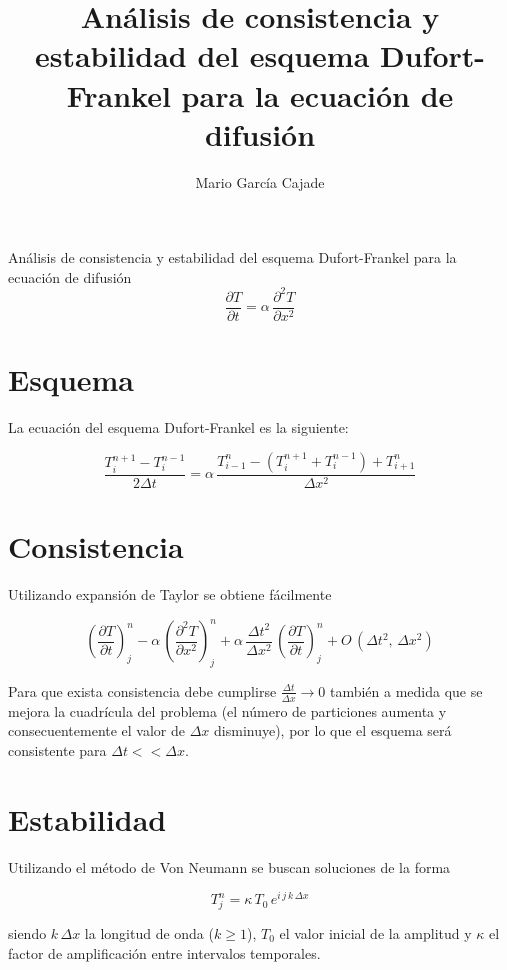 \documentclass[a4paper,3.3mm]{article}
\title{Análisis de consistencia y estabilidad del esquema Dufort-Frankel para la ecuación de difusión}
\author{Mario García Cajade}
\date{}
\newcommand{\parn}[1]{\left(#1\right)}
\begin{document}
{
\centering
\vspace*{-14mm}
\fontsize{8mm}{12mm}\selectfont%
Análisis de consistencia y estabilidad del esquema Dufort-Frankel para la ecuación de difusión\\[-4mm]
\[ \frac{\partial T}{\partial t} = \alpha\,\frac{\partial^{2} T}{\partial x^{2}} \]
}

\raggedright
\fontsize{5.25mm}{7mm}\selectfont
\section*{\fontsize{7mm}{10.5mm}\selectfont Esquema}

La ecuación del esquema Dufort-Frankel es la siguiente:

\begin{equation}
    \frac{T_{i}^{n+1} - T_{i}^{n-1}}{2 \Delta t} = \alpha\,\frac{T_{i-1}^{n} - \parn{ T_{i}^{n+1} + T_{i}^{n-1}} + T_{i+1}^{n}}{\Delta x^{2} }
    \tag{DF}
\end{equation}

\section*{\fontsize{7mm}{10.5mm}\selectfont Consistencia}

Utilizando expansión de Taylor se obtiene fácilmente

\[
    \parn{ \frac{\partial T}{\partial t} }_{j}^{n} - \alpha\,\parn{ \frac{\partial^{2} T}{\partial x^{2}} }_{j}^{n} + \alpha\,\frac{\Delta t^{2}}{\Delta x^{2}}\,\parn{ \frac{\partial T}{\partial t} }_{j}^{n} + O\,\parn{ \Delta t^{2},\, \Delta x^{2} }
\]

Para que exista consistencia debe cumplirse \( \frac{\Delta t}{\Delta x} \rightarrow 0 \)
también a medida que se mejora la cuadrícula del problema (el número de particiones aumenta y consecuentemente el valor de 
\(\Delta x\) disminuye), por lo que el esquema será consistente para \( \Delta t << \Delta x \).

\newpage
\section*{\fontsize{7mm}{10.5mm}\selectfont Estabilidad}

Utilizando el método de Von Neumann se buscan soluciones de la forma

\[
    T_{j}^{n} = \kappa\,T_{0}\,e^{i\,j\,k\,\Delta x}
\]

siendo \( k\,\Delta x \) la longitud de onda (\( k \geq 1 \)), \( T_{0} \) el valor inicial de la amplitud y \( \kappa \)
el factor de amplificación entre intervalos temporales.
\end{document}
